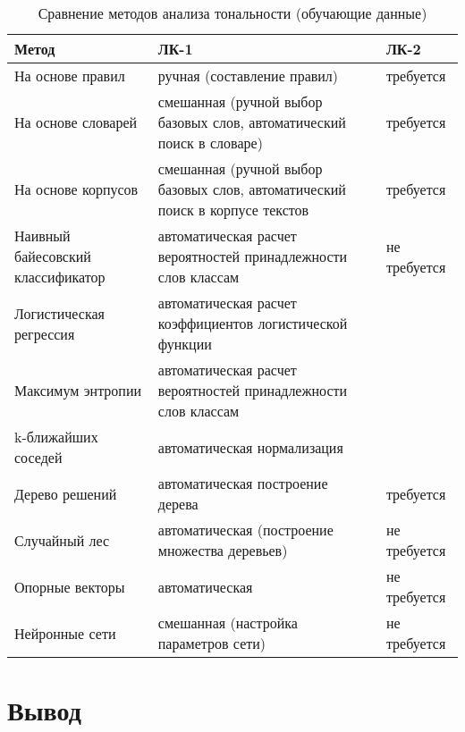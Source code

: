 \noindent
\captionsetup{format=hang,justification=raggedright,
              singlelinecheck=off,width=14.6cm}
\begin{longtable}[c]{|p{5cm}|p{5cm}|p{3cm}|}
\caption{Сравнение методов анализа тональности (обучающие данные)\label{tab:03}}\\
    \hline
    \textbf{Метод} & \textbf{ЛК-1} & \textbf{ЛК-2}\\
    \hline
    На основе правил    & ручная
                          (составление правил) & требуется\\
    \hline
    На основе словарей  & смешанная
                          (ручной выбор базовых слов,
                           автоматический поиск в словаре) & требуется\\
    \hline
    На основе корпусов  & смешанная
                          (ручной выбор базовых слов,
                           автоматический поиск в корпусе текстов & требуется\\
    \hline
    Наивный
    байесовский
    классификатор       & автоматическая
                          расчет вероятностей
                          принадлежности слов классам  & не требуется\\
    \hline
    Логистическая
    регрессия           & автоматическая
                          расчет коэффициентов
                          логистической функции & \\
    \hline
    Максимум энтропии   & автоматическая
                          расчет вероятностей
                          принадлежности слов классам & \\
    \hline
    k-ближайших соседей & автоматическая
                          нормализация & \\
    \hline
    Дерево решений      & автоматическая
                          построение дерева & требуется\\
    \hline
    Случайный лес       & автоматическая
                          (построение множества деревьев) & не требуется\\
    \hline
    Опорные векторы     & автоматическая & не требуется\\
    \hline
    Нейронные сети      & смешанная
                          (настройка параметров сети) & не требуется \\
    \hline
\end{longtable}

\section{Вывод}
